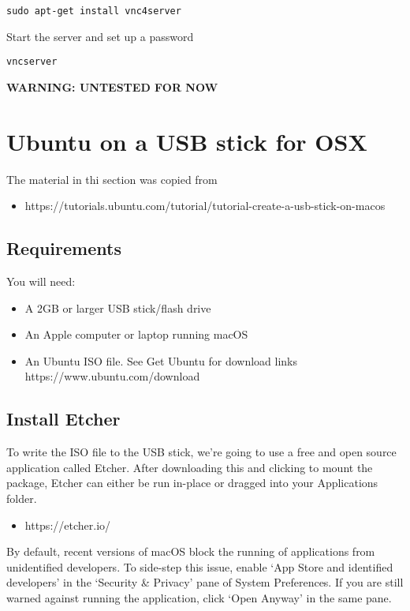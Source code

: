 \begin{lstlisting}
sudo apt-get install vnc4server
\end{lstlisting}

Start the server and set up a password

\begin{lstlisting}
vncserver
\end{lstlisting}

\textbf{WARNING: UNTESTED FOR NOW}

\section{Ubuntu on a USB stick for OSX}

The material in thi section was copied from

\begin{itemize}
\item
  https://tutorials.ubuntu.com/tutorial/tutorial-create-a-usb-stick-on-macos
\end{itemize}

\subsection{Requirements}

You will need:

\begin{itemize}
\item
  A 2GB or larger USB stick/flash drive
\item
  An Apple computer or laptop running macOS
\item
  An Ubuntu ISO file. See Get Ubuntu for download links
  https://www.ubuntu.com/download
\end{itemize}

\subsection{Install Etcher}

To write the ISO file to the USB stick, we're going to use a free and
open source application called Etcher. After downloading this and
clicking to mount the package, Etcher can either be run in-place or
dragged into your Applications folder.

\begin{itemize}
\item
  https://etcher.io/
\end{itemize}

By default, recent versions of macOS block the running of applications
from unidentified developers. To side-step this issue, enable `App Store
and identified developers' in the `Security \& Privacy' pane of System
Preferences. If you are still warned against running the application,
click `Open Anyway' in the same pane.

